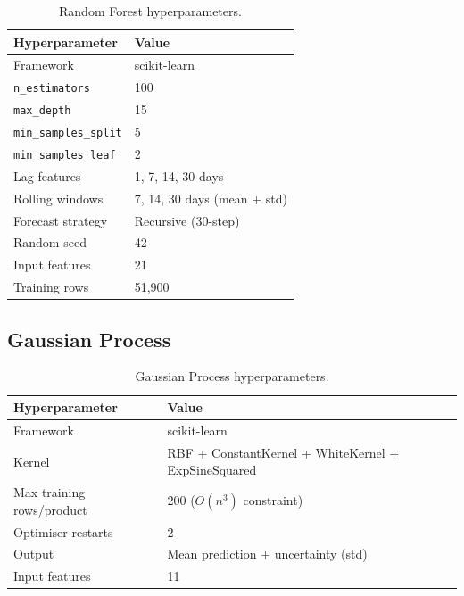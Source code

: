 \documentclass[12pt, a4paper]{article}
\begin{document}
\begin{table}[H]
    \centering
    \caption{Random Forest hyperparameters.}
    \label{tab:rf_hp}
    \renewcommand{\arraystretch}{1.2}
    \begin{tabular}{@{}ll@{}}
        \toprule
        \textbf{Hyperparameter} & \textbf{Value} \\
        \midrule
        Framework               & scikit-learn \\
        \texttt{n\_estimators}  & 100 \\
        \texttt{max\_depth}     & 15 \\
        \texttt{min\_samples\_split} & 5 \\
        \texttt{min\_samples\_leaf}  & 2 \\
        Lag features            & 1, 7, 14, 30 days \\
        Rolling windows         & 7, 14, 30 days (mean + std) \\
        Forecast strategy       & Recursive (30-step) \\
        Random seed             & 42 \\
        Input features          & 21 \\
        Training rows           & 51,900 \\
        \bottomrule
    \end{tabular}
\end{table}

\subsection{Gaussian Process}

\begin{table}[H]
    \centering
    \caption{Gaussian Process hyperparameters.}
    \label{tab:gp_hp}
    \renewcommand{\arraystretch}{1.2}
    \begin{tabular}{@{}ll@{}}
        \toprule
        \textbf{Hyperparameter} & \textbf{Value} \\
        \midrule
        Framework                  & scikit-learn \\
        Kernel                     & RBF + ConstantKernel + WhiteKernel + ExpSineSquared \\
        Max training rows/product  & 200 ($O(n^{3})$ constraint) \\
        Optimiser restarts         & 2 \\
        Output                     & Mean prediction + uncertainty (std) \\
        Input features             & 11 \\
        \bottomrule
    \end{tabular}
\end{table}
\end{document}

